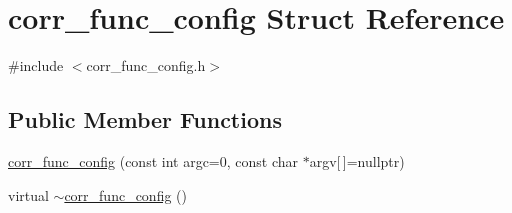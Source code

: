 \hypertarget{structcorr__func__config}{}\section{corr\+\_\+func\+\_\+config Struct Reference}
\label{structcorr__func__config}


{\ttfamily \#include $<$corr\+\_\+func\+\_\+config.\+h$>$}

\subsection*{Public Member Functions}
\begin{DoxyCompactItemize}
\item 
\hyperlink{structcorr__func__config_a1d1717cef2daadfc19c4483323377d08}{corr\+\_\+func\+\_\+config} (const int argc=0, const char $\ast$argv\mbox{[}$\,$\mbox{]}=nullptr)
\item 
virtual \hyperlink{structcorr__func__config_a8cfc94f47cce05f0d4b30e53c6afd3d3}{$\sim$corr\+\_\+func\+\_\+config} ()
\end{DoxyCompactItemize}
